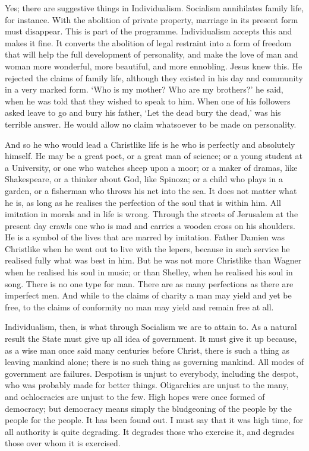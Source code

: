 Yes; there are suggestive things in Individualism. Socialism annihilates family life, for instance. With the abolition of private property, marriage in its present form must disappear. This is part of the programme. Individualism accepts this and makes it fine. It converts the abolition of legal restraint into a form of freedom that will help the full development of personality, and make the love of man and woman more wonderful, more beautiful, and more ennobling. Jesus knew this. He rejected the claims of family life, although they existed in his day and community in a very marked form. ‘Who is my mother? Who are my brothers?’ he said, when he was told that they wished to speak to him. When one of his followers asked leave to go and bury his father, ‘Let the dead bury the dead,’ was his terrible answer. He would allow no claim whatsoever to be made on personality.\par

And so he who would lead a Christlike life is he who is perfectly and absolutely himself. He may be a great poet, or a great man of science; or a young student at a University, or one who watches sheep upon a moor; or a maker of dramas, like Shakespeare, or a thinker about God, like Spinoza; or a child who plays in a garden, or a fisherman who throws his net into the sea. It does not matter what he is, as long as he realises the perfection of the soul that is within him. All imitation in morals and in life is wrong. Through the streets of Jerusalem at the present day crawls one who is mad and carries a wooden cross on his shoulders. He is a symbol of the lives that are marred by imitation. Father Damien was Christlike when he went out to live with the lepers, because in such service he realised fully what was best in him. But he was not more Christlike than Wagner when he realised his soul in music; or than Shelley, when he realised his soul in song. There is no one type for man. There are as many perfections as there are imperfect men. And while to the claims of charity a man may yield and yet be free, to the claims of conformity no man may yield and remain free at all.\par

Individualism, then, is what through Socialism we are to attain to. As a natural result the State must give up all idea of government. It must give it up because, as a wise man once said many centuries before Christ, there is such a thing as leaving mankind alone; there is no such thing as governing mankind. All modes of government are failures. Despotism is unjust to everybody, including the despot, who was probably made for better things. Oligarchies are unjust to the many, and ochlocracies are unjust to the few. High hopes were once formed of democracy; but democracy means simply the bludgeoning of the people by the people for the people. It has been found out. I must say that it was high time, for all authority is quite degrading. It degrades those who exercise it, and degrades those over whom it is exercised.\par

